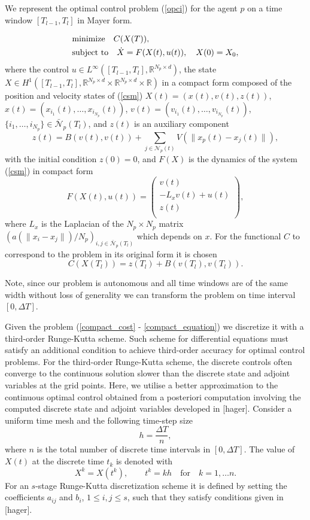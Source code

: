 \documentclass[a4paper,10pt, english]{article}
\newcommand{\D}{\displaystyle}
\begin{document}
 
 We represent the optimal control problem (\ref{opci}) for the agent $p$ on a time window $[T_{l-1}, T_{l}]$ in Mayer form.
  
 \begin{align}
 \D
 & \mbox{minimize}\quad  C(X(T)),   \label{compact_cost} \\ 
 & \mbox{subject to} \quad \dot{X} = F(X(t), u(t)), \quad X(0) = X_0, \label{compact_equation}
 \end{align}
where  the control $u \in  L^{\infty}([T_{l-1}, T_{l}], \mathbb{R}^{N_p \times d})$,
the state $X\in H^1([T_{l-1}, T_{l}], \mathbb{R}^{N_p \times d} \times \mathbb{R}^{N_p\times d} \times \mathbb{R})$
in a compact form composed of the position and velocity 
states of (\ref{csm})   $X(t) = (x(t), v(t), z(t))$, $x(t) = (x_{i_1}(t), \dots, x_{i_{N_p}}(t))$,
 $v(t) = (v_{i_1}(t), \dots, v_{i_{N_p}}(t))$, $\{i_1, \dots, i_{N_p}\} \in \bar{\mathcal{N}}_p(T_l)$, 
 and $z(t)$ is an auxiliary component 
 $$
 z(t) = B(v(t), v(t)) + \sum_{j\in \mathcal{N}_p(t)} V(\|x_p(t) - x_j(t)\|),
 $$
 with the initial condition $z(0) = 0$, and $F(X)$ is the dynamics of the system (\ref{csm}) in compact form
 $$
 F(X(t), u(t)) =
  \left( 
  \begin{array}{c}
  v(t)\\
   - L_xv(t) + u(t)\\
   z(t)\\
 \end{array} 
 \right), 
 $$
 where $L_x$ is the Laplacian of the $N_p\times N_p$ matrix $(a(\|x_i - x_j\|)/N_p)_{i, j\in\bar{\mathcal{N}}_p(T_l)}$ which depends on $x$.
 For the functional $C$ to correspond to the problem in its original form it is chosen 
 $$
 C(X(T_l)) = z(T_l) + B(v(T_l), v(T_l)).
 $$
 
  Note, since our problem is autonomous and all time windows are of the same width without loss of generality
 we can transform the problem on time interval $[0, \Delta T]$. 
 
 
  
  Given the problem (\ref{compact_cost} - \ref{compact_equation}) we discretize it with a third-order Runge-Kutta scheme. Such scheme for differential equations  must satisfy an additional condition to achieve third-order accuracy
  for optimal control problems. For the third-order Runge-Kutta scheme, the discrete controls often converge to the continuous solution slower than the discrete state and adjoint variables at the grid points. Here, we utilise a better approximation to the continuous optimal control obtained from a posteriori computation involving the computed discrete state and adjoint variables  developed in [hager]. 
  Consider a uniform time mesh and the following time-step size
 \begin{equation}
   h = \frac{\Delta T}{n},
   \label{h}
 \end{equation}
 where $n$ is the total number of discrete time intervals in $[0, \Delta T]$.  The value of $X(t)$ at the discrete time $t_k$ is denoted with
 $$
 X^k = X(t^k), \qquad t^k = kh \quad\mbox{for} \quad k = 1, \dots n.
 $$
 For an $s$-stage Runge-Kutta discretization scheme it is defined by setting the coefficients $a_{ij}$ and
 $b_{i}$, $1\leq i, j\leq s$, such that they satisfy conditions given in [hager]. 
 
\end{document}
